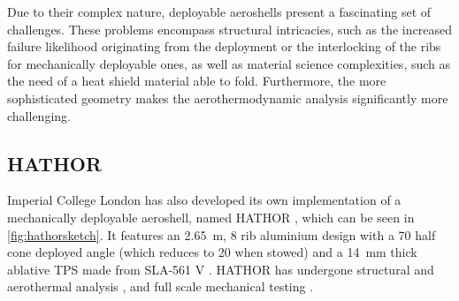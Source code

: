 Due to their complex nature, deployable aeroshells present a fascinating set of challenges. These problems encompass structural intricacies, such as the increased failure likelihood originating from the deployment or the interlocking of the ribs for mechanically deployable ones, as well as material science complexities, such as the need of a heat shield material able to fold. Furthermore, the more sophisticated geometry makes the aerothermodynamic analysis significantly more challenging.

\subsection{HATHOR}

Imperial College London has also developed its own implementation of a mechanically deployable aeroshell, named HATHOR \cite{hathordesign}, which can be seen in \autoref{fig:hathorsketch}. It features an \SI{2.65}{\m}, 8 rib aluminium design with a \SI{70}{\deg} half cone deployed angle (which reduces to \SI{20}{\deg} when stowed) \cite{hathordesign} and a \SI{14}{\mm} thick ablative TPS made from SLA-561 V \cite{hathoraero1}. HATHOR has undergone structural \cite{hathordesign} and aerothermal analysis \cite{hathoraero1}, and full scale mechanical testing \cite{hathorstructest}.

